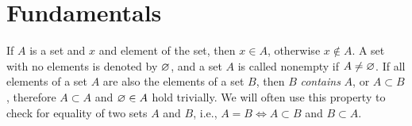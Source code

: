 \chapter{Fundamentals}

If $A$ is a set and $x$ and element of the set, then $x\in A$, otherwise $x \notin A$. A set with no elements is denoted by $\varnothing$, and a set $A$ is called nonempty if $A\neq \varnothing$. If all elements of a set $A$ are also the elements of a set $B$, then $B$ \textit{contains} $A$, or $A \subset B$, therefore $A \subset A$ and $\varnothing\in A$ hold trivially. We will often use this property to check for equality of two sets $A$ and $B$, i.e., $A=B \iff A\subset B$ and $B\subset A$.